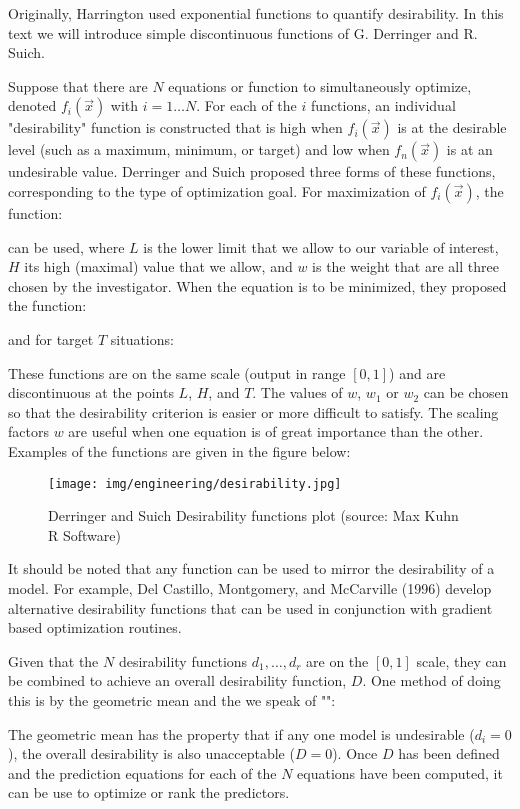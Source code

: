 	Originally, Harrington used exponential functions to quantify desirability. In this text we will introduce simple discontinuous functions of G. Derringer and R. Suich.

	Suppose that there are $N$ equations or function to simultaneously optimize, denoted $f_i(\vec{x})$ with $i= 1 \ldots N$. For each of the $i$ functions, an individual "desirability" function is constructed that is high when $f_i(\vec{x})$ is at the desirable level (such as a maximum, minimum, or target) and low when $f_n(\vec{x})$ is at an undesirable value. Derringer and Suich proposed three forms of these functions, corresponding to the type of optimization goal. For maximization of $f_i(\vec{x})$, the function:
	
	can be used, where $L$ is the lower limit that we allow to our variable of interest, $H$ its high (maximal) value that we allow, and $w$ is the weight that are all three chosen by the investigator. When the equation is to be minimized, they proposed the function:
	
	and for target $T$ situations:
	
	These functions are on the same scale (output in range $[0,1]$) and are discontinuous at the points $L$, $H$, and $T$. The values
of $w$, $w_1$ or $w_2$ can be chosen so that the desirability criterion is easier or more difficult to satisfy. The scaling factors $w$ are useful when one equation is of great importance than the other. Examples of the functions are given in the figure below:
	\begin{figure}[H]
		\centering
		\texttt{[image: img/engineering/desirability.jpg]}
		\caption[Derringer and Suich Desirability functions plot]{Derringer and Suich Desirability functions plot (source: Max Kuhn R Software)}	
	\end{figure}
	It should be noted that any function can be used to mirror the desirability of a model. For example, Del Castillo, Montgomery, and McCarville (1996) develop alternative desirability functions that can be used in conjunction with gradient based optimization routines.

	Given that the $N$ desirability functions $d_1,\ldots, d_r$ are on the $[0,1]$ scale, they can be combined to achieve an overall desirability function, $D$. One method of doing this is by the geometric mean and the we speak of "":
	
	The geometric mean has the property that if any one model is undesirable ($d_i=0$), the overall desirability is also unacceptable ($D=0$). Once $D$ has been defined and the prediction equations for each of the $N$ equations have been computed, it can be use to optimize or rank the predictors.

